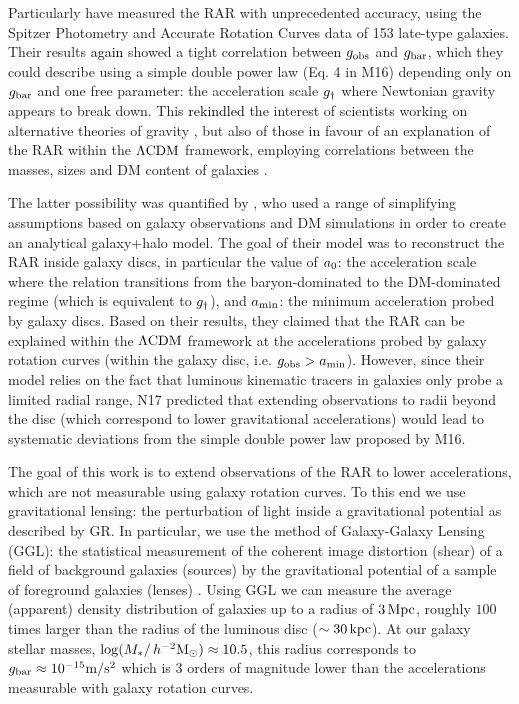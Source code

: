 \documentclass[usenatbib]{mnras}
\newcommand{\hmsun}{\,h^{-2} {\rm M_\odot}}
\newcommand{\mpss}{ {\rm m/s^2} }
\newcommand{\lcdm}{{\rm \Lambda CDM}}
\newcommand{\un}[1]{_{\rm #1}}
\begin{document}
Particularly \citet[][hereafter M16]{mcgaugh2016} have measured the RAR with unprecedented accuracy, using the Spitzer Photometry and Accurate Rotation Curves \cite[SPARC,][]{lelli2016b} data of 153 late-type galaxies. Their results \textcolor{black}{again} showed a tight correlation between $g\un{obs}$ and $g\un{bar}$, which they could describe using a simple double power law (Eq. 4 in M16) depending only on $g\un{bar}$ and one free parameter: the acceleration scale $g\un{\dagger}$ where Newtonian gravity appears to break down. This \textcolor{black}{rekindled} the interest of scientists working on alternative theories of gravity \cite[]{lelli2017a,lelli2017b,burrage2017,li2018,obrien2019}, but also of those in favour of an explanation of the RAR within the $\lcdm$ framework, employing correlations between the masses, sizes and DM content of galaxies \cite[]{keller2017,desmond2017,ludlow2017,tenneti2018}.

The latter possibility was quantified by \citet[][hereafter N17]{navarro2017}, who used a range of simplifying assumptions based on galaxy observations and DM simulations in order to create an analytical galaxy+halo model. The goal of their model was to reconstruct the RAR inside galaxy discs, in particular the value of $a\un{0}$: the acceleration scale where the relation transitions from the baryon-dominated to the DM-dominated regime (which is equivalent to $g\un{\dagger}$), and $a\un{min}$: the minimum acceleration probed by galaxy discs. Based on their results, they claimed that the RAR can be explained within the $\lcdm$ framework at the accelerations probed by galaxy rotation curves (within the galaxy disc, i.e. $g\un{obs}>a\un{min}$). However, since their model relies on the fact that luminous kinematic tracers in galaxies only probe a limited radial range, N17 predicted that extending observations to radii beyond the disc (which correspond to lower gravitational accelerations) would lead to systematic deviations from the simple double power law proposed by M16.

The goal of this work is to extend observations of the RAR to lower accelerations, which are not measurable using galaxy rotation curves. To this end we use gravitational lensing: the perturbation of light inside a gravitational potential as described by GR. In particular, we use the method of Galaxy-Galaxy Lensing (GGL): the statistical measurement of the coherent image distortion (shear) of a field of background galaxies (sources) by the gravitational potential of a sample of foreground galaxies (lenses) \cite[for examples, see e.g.][]{fischer2000ggl,hoekstra2004,mandelbaum2006,uitert2016}. Using GGL we can measure the average (apparent) density distribution of galaxies up to a radius of $3\,{\rm Mpc}$, roughly $100$ times larger than the radius of the luminous disc ($\sim 30\,{\rm kpc}$). At our galaxy stellar masses, $\log(M_*/\hmsun) \approx 10.5$, this radius corresponds to $g\un{bar}\approx10^{-15} \mpss$ which is $3$ orders of magnitude lower than the accelerations measurable with galaxy rotation curves.
\end{document}
